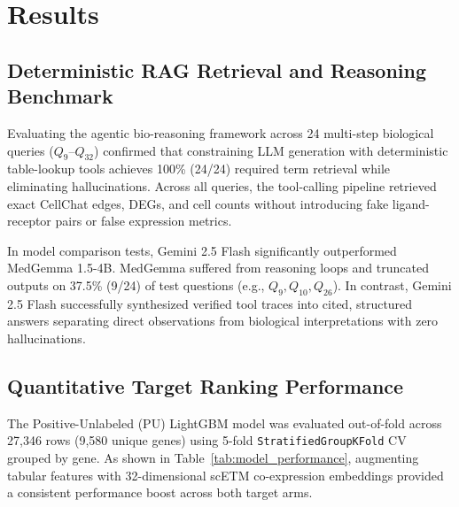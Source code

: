 \documentclass[conference]{IEEEtran}
\begin{document}
\section{Results}

\subsection{Deterministic RAG Retrieval and Reasoning Benchmark}
Evaluating the agentic bio-reasoning framework across 24 multi-step biological queries ($Q_{9}$--$Q_{32}$) confirmed that constraining LLM generation with deterministic table-lookup tools achieves 100\% (24/24) required term retrieval while eliminating hallucinations. Across all queries, the tool-calling pipeline retrieved exact CellChat edges, DEGs, and cell counts without introducing fake ligand-receptor pairs or false expression metrics.

In model comparison tests, Gemini 2.5 Flash significantly outperformed MedGemma 1.5-4B. MedGemma suffered from reasoning loops and truncated outputs on 37.5\% (9/24) of test questions (e.g., $Q_{9}, Q_{10}, Q_{26}$). In contrast, Gemini 2.5 Flash successfully synthesized verified tool traces into cited, structured answers separating direct observations from biological interpretations with zero hallucinations.

\subsection{Quantitative Target Ranking Performance}
The Positive-Unlabeled (PU) LightGBM model was evaluated out-of-fold across 27,346 rows (9,580 unique genes) using 5-fold \texttt{StratifiedGroupKFold} CV grouped by gene. As shown in Table~\ref{tab:model_performance}, augmenting tabular features with 32-dimensional scETM co-expression embeddings provided a consistent performance boost across both target arms.
\end{document}
